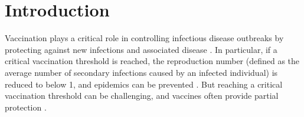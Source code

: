 \documentclass[12pt]{article}
\begin{document}
\pagebreak

\section*{Introduction}

Vaccination plays a critical role in controlling infectious disease outbreaks by protecting against new infections and associated disease \citep{iwasaki2020and}.
In particular, if a critical vaccination threshold is reached, the reproduction number (defined as the average number of secondary infections caused by an infected individual) is reduced to below 1, and epidemics can be prevented \citep{anderson1985vaccination}.
But reaching a critical vaccination threshold can be challenging, and vaccines often provide partial protection \citep{gandon2003imperfect,anderson2020challenges}.

\end{document}
